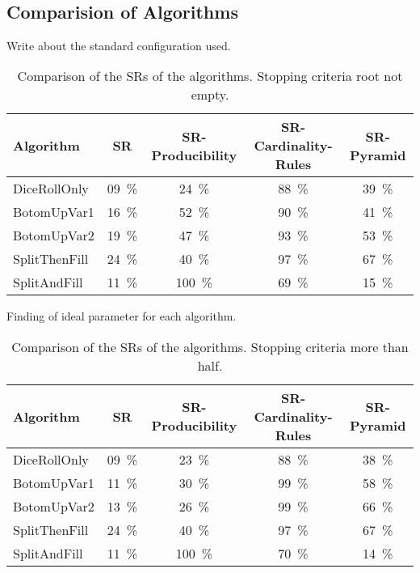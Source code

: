 \noindent
{}
\\


\pagebreak
\subsection{Comparision of Algorithms} \label{ComparisonOfAlgorithms}
\noindent Write about the standard configuration used.
\begin{table}[H]
	\centering
	\begin{tabular}{ | l | c |c |c |c | }
		\hline
Algorithm 		& SR 	& SR-Producibility 	& SR-Cardinality-Rules 	& SR-Pyramid   	\\ \hline
\hline
DiceRollOnly 	& 09~\%	& 24~\% & 88~\% & 39~\%		\\ \hline
BotomUpVar1 	& 16~\% & 52~\% & 90~\% & 41~\% 	\\ \hline
BotomUpVar2 	& 19~\% & 47~\% & 93~\% & 53~\% 	\\ \hline
SplitThenFill 	& 24~\% & 40~\% & 97~\% & 67~\% 	\\ \hline
SplitAndFill 	& 11~\% & 100~\% & 69~\% & 15~\% 	\\ \hline
	\end{tabular}
	\caption{Comparison of the SRs of the algorithms. Stopping criteria root not empty.}
	\label{comparisonAlgorithms}
\end{table}
Finding of ideal parameter for each algorithm.

\begin{table}[H]
	\centering
	\begin{tabular}{ | l | c |c |c |c | }
		\hline
		Algorithm 		& SR 	& SR-Producibility 	& SR-Cardinality-Rules 	& SR-Pyramid   	\\ \hline
		\hline
		DiceRollOnly 	& 09~\%	& 23~\% & 88~\% & 38~\%		\\ \hline
		BotomUpVar1 	& 11~\% & 30~\% & 99~\% & 58~\% 	\\ \hline
		BotomUpVar2 	& 13~\% & 26~\% & 99~\% & 66~\% 	\\ \hline
		SplitThenFill 	& 24~\% & 40~\% & 97~\% & 67~\% 	\\ \hline
		SplitAndFill 	& 11~\% & 100~\% & 70~\% & 14~\% 	\\ \hline
	\end{tabular}
	\caption{Comparison of the SRs of the algorithms. Stopping criteria more than half.}
	\label{comparisonAlgorithms}
\end{table}



